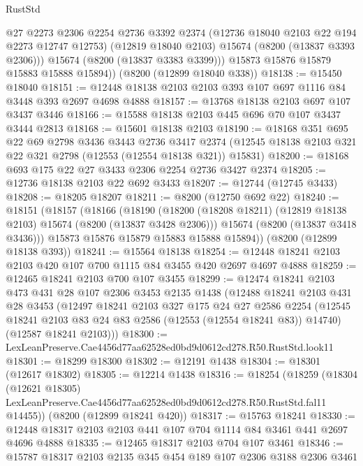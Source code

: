 \begin{lexlean}{RustStd}
\begin{coremodule}
            @27
            @2273
            @2306
            @2254
            @2736
            @3392
            @2374
            (@12736 @18040 @2103 @22 @194 @2273 @12747 @12753)
            (@12819 @18040 @2103)
            @15674
            (@8200 (@13837 @3393 @2306)))
          @15674
          (@8200 (@13837 @3383 @3399)))
        @15873
        @15876
        @15879
        @15883
        @15888
        @15894))
    (@8200 (@12899 @18040 @338))
@18138 := @15450 @18040
@18151 := @12448 @18138 @2103 @2103 @393 @107 @697 @1116 @84 @3448 @393 @2697 @4698 @4888
@18157 := @13768 @18138 @2103 @697 @107 @3437 @3446
@18166 := @15588 @18138 @2103 @445 @696 @70 @107 @3437 @3444 @2813
@18168 := @15601 @18138 @2103
@18190 := @18168
    @351
    @695
    @22
    @69
    @2798
    @3436
    @3443
    @2736
    @3417
    @2374
    (@12545 @18138 @2103 @321 @22 @321 @2798 (@12553 (@12554 @18138 @321)) @15831)
@18200 := @18168 @693 @175 @22 @27 @3433 @2306 @2254 @2736 @3427 @2374
@18205 := @12736 @18138 @2103 @22 @692 @3433
@18207 := @12744 (@12745 @3433)
@18208 := @18205 @18207
@18211 := @8200 (@12750 @692 @22)
@18240 := @18151
    (@18157
      (@18166
        (@18190
          (@18200 (@18208 @18211) (@12819 @18138 @2103) @15674 (@8200 (@13837 @3428 @2306)))
          @15674
          (@8200 (@13837 @3418 @3436)))
        @15873
        @15876
        @15879
        @15883
        @15888
        @15894))
    (@8200 (@12899 @18138 @393))
@18241 := @15564 @18138
@18254 := @12448 @18241 @2103 @2103 @420 @107 @700 @1115 @84 @3455 @420 @2697 @4697 @4888
@18259 := @12465 @18241 @2103 @700 @107 @3455
@18299 := @12474
    @18241
    @2103
    @473
    @431
    @28
    @107
    @2306
    @3453
    @2135
    @1438
    (@12488
      @18241
      @2103
      @431
      @28
      @3453
      (@12497
        @18241
        @2103
        @327
        @175
        @24
        @27
        @2586
        @2254
        (@12545 @18241 @2103 @83 @24 @83 @2586 (@12553 (@12554 @18241 @83)) @14740)
        (@12587 @18241 @2103)))
@18300 := LexLeanPreserve.Cae4456d77aa62528ed0bd9d0612cd278.R50.RustStd.look11
@18301 := @18299 @18300
@18302 := @12191 @1438
@18304 := @18301 (@12617 @18302)
@18305 := @12214 @1438
@18316 := @18254
    (@18259
      (@18304
        (@12621 @18305)
        LexLeanPreserve.Cae4456d77aa62528ed0bd9d0612cd278.R50.RustStd.fal11
        @14455))
    (@8200 (@12899 @18241 @420))
@18317 := @15763 @18241
@18330 := @12448 @18317 @2103 @2103 @441 @107 @704 @1114 @84 @3461 @441 @2697 @4696 @4888
@18335 := @12465 @18317 @2103 @704 @107 @3461
@18346 := @15787 @18317 @2103 @2135 @345 @454 @189 @107 @2306 @3188 @2306 @3461

\end{coremodule}
\end{lexlean}
